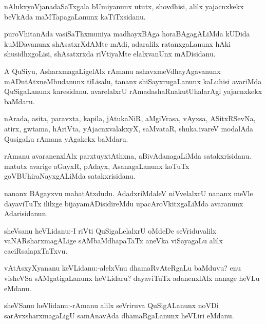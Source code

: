 \documentclass{article}
\begin{document}
\begin{mn}%
nAlukxyoVjanadaSaTxgala bUmiyanunx ututx, shovdhisi, alilx yajacnxkekx beVkAda 
maMTapagaLanunx kaTiTxsidanu.
\end{mn}

\begin{mn}%
puroVhitanAda vasiSaThxmuniya madhayxBAga horaBAgagALiMda kUDida kuMDavanunx 
shAsatxrXdAMte mAdi, adaralilx ratanxgaLanunx hAki shusidhxgoLisi, shAsatxrxda riVtiyaMte 
elalxvanUnx mADisidanu.
\end{mn}

\begin{mn}%
A QuSiyu, AsharxmagaLigelAlx rAmanu ashavxmeVdhayAgavanunx mADutAtxneMbudanunx tiLisalu, 
tananx shiSayxrugaLanunx kaLuhisi avariMda QuSigaLanunx karesidanu. avarelalxrU 
rAmadashaRnakutUhalarAgi yajacnxkekx baMdaru.
\end{mn}

\begin{mn}%
nArada, asita, paravxta, kapila, jAtukaNiR, aMgiVrasa, vAyxsa, ASitxRSevNa, atirx, gwtama, 
hAriVta, yAjacnxvalakxyX, saMvataR, shuka.ivareV modalAda QusigaLu rAmana yAgakekx baMdaru.
\end{mn}

\begin{mn}%
rAmanu avaranenxlAlx parxtuyxtAthxna, aBivAdanagaLiMda satakxrisidanu. matutx avarige 
aGayxR, pAdayx, AsanagaLanunx koTuTx goVBUhiraNayxgALiMda satakxrisidanu.
\end{mn}

\begin{mn}%
nananx BAgayxvu mahatAtxdudu. AdadxriMdaleV niVvelalxrU nananx meVle dayaviTuTx ililxge 
bijayamADisidireMdu upacAroVkitxgaLiMda avaranunx Adarisidanun.
\end{mn}

\begin{mn}%
sheVsanu heVLidanu:-I riVti QuSigaLelalxrU oMdeDe seVriduvalilx vaNARsharxmagALige 
sAMbaMdhapaTaTx aneVka viSayagaLu alilx caciRsalapxTaTxvu.
\end{mn}

\begin{mn}%
vAtAsxyXyananu keVLidanu:-alelxVnu dhamaRvAteRgaLu baMduvu? enu visheVSa sAMgatigaLanunx 
heVLidaru? dayaviTuTx adanenxlAlx nanage heVLu eMdanu. 
\end{mn}

\begin{mn}%
sheVSanu heVlidanu:-rAmanu alilx seVriruva QuSigALanunx noVDi sarAvxsharxmagaLigU 
samAnavAda dhamaRgaLanunx heVLiri eMdanu.
\end{mn}
\end{document}
